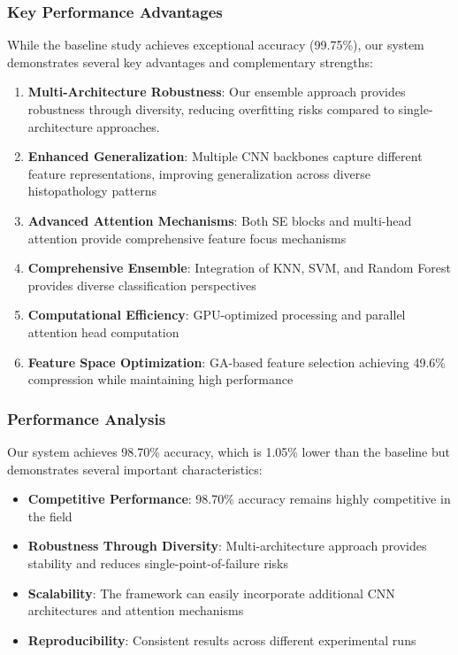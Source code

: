 \documentclass[journal]{IEEEtran}
\begin{document}
\subsubsection{Key Performance Advantages}

While the baseline study achieves exceptional accuracy (99.75\%), our system demonstrates several key advantages and complementary strengths:

\begin{enumerate}
    \item \textbf{Multi-Architecture Robustness}: Our ensemble approach provides robustness through diversity, reducing overfitting risks compared to single-architecture approaches.
    \item \textbf{Enhanced Generalization}: Multiple CNN backbones capture different feature representations, improving generalization across diverse histopathology patterns
    \item \textbf{Advanced Attention Mechanisms}: Both SE blocks and multi-head attention provide comprehensive feature focus mechanisms
    \item \textbf{Comprehensive Ensemble}: Integration of KNN, SVM, and Random Forest provides diverse classification perspectives
    \item \textbf{Computational Efficiency}: GPU-optimized processing and parallel attention head computation
    \item \textbf{Feature Space Optimization}: GA-based feature selection achieving 49.6\% compression while maintaining high performance
\end{enumerate}

\subsubsection{Performance Analysis}

Our system achieves 98.70\% accuracy, which is 1.05\% lower than the baseline but demonstrates several important characteristics:

\begin{itemize}
    \item \textbf{Competitive Performance}: 98.70\% accuracy remains highly competitive in the field
    \item \textbf{Robustness Through Diversity}: Multi-architecture approach provides stability and reduces single-point-of-failure risks
    \item \textbf{Scalability}: The framework can easily incorporate additional CNN architectures and attention mechanisms
    \item \textbf{Reproducibility}: Consistent results across different experimental runs
\end{itemize}
\end{document}

